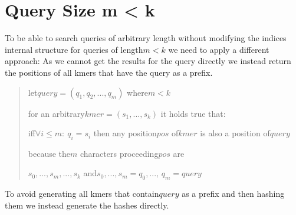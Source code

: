 \section{\label{section m < k}Query Size m < k}

To be able to search queries of arbitrary length without modifying
the indices internal structure for queries of length$m<k$ we need
to apply a different approach: As we cannot get the results for the
query directly we instead return the positions of all kmers that have
the query as a prefix.
\begin{verse}
let$query=(q_{1},q_{2},...,q_{m})$ where$m<k$

for an arbitrary$kmer=(s_{1},...,s_{k})$ it holds true that:

iff$\forall i\leq m:\:q_{i}=s_{i}$ then any position$pos$ of$kmer$
is also a position of$query$

because the$m$ characters proceeding$pos$ are

$s_{0},...,s_{m},...,s_{k}$ and$s_{0},...,s_{m}=q_{0},...,\,q_{m}=query$
\end{verse}
\noindent To avoid generating all kmers that contain$query$ as a
prefix and then hashing them we instead generate the hashes directly.
